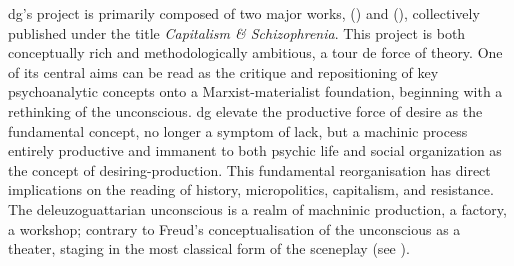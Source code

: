 
\Gls{dg}’s project is primarily composed of two major works,  (\cite*{deleuze1983}) and  (\cite*{deleuze1987}), collectively published under the title \textit{Capitalism \& Schizophrenia}. This project is both conceptually rich and methodologically ambitious, a tour de force of theory. One of its central aims can be read as the critique and repositioning of key psychoanalytic concepts onto a Marxist-materialist foundation, beginning with a rethinking of the unconscious. \Gls{dg} elevate the productive force of desire as the fundamental concept, no longer a symptom of lack, but a machinic process entirely productive and immanent to both psychic life and social organization as the concept of desiring-production. This fundamental reorganisation has direct implications on the reading of history, micropolitics, capitalism, and resistance.
The deleuzoguattarian unconscious is a realm of machninic production, a
factory, a workshop; contrary
to Freud's conceptualisation of the unconscious as a theater, staging in the
most classical form of the sceneplay (see \cite[54]{deleuze1983} ).
